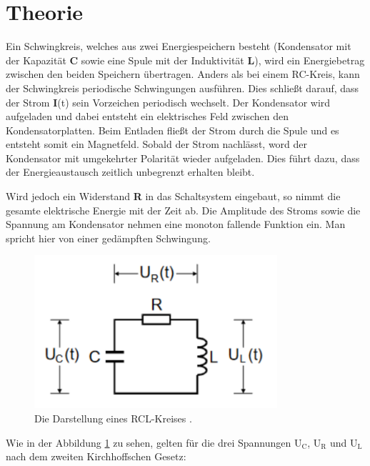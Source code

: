 \section{Theorie}

\begin{flushleft}
    Ein Schwingkreis, welches aus zwei Energiespeichern besteht (Kondensator mit der Kapazität \textbf{C} sowie eine Spule mit der Induktivität \textbf{L}), wird ein Energiebetrag zwischen den beiden Speichern übertragen.
    Anders als bei einem RC-Kreis, kann der Schwingkreis periodische Schwingungen ausführen.
    Dies schließt darauf, dass der Strom \textbf{I}(t) sein Vorzeichen periodisch wechselt.
    Der Kondensator wird aufgeladen und dabei entsteht ein elektrisches Feld zwischen den Kondensatorplatten.
    Beim Entladen fließt der Strom durch die Spule und es entsteht somit ein Magnetfeld.
    Sobald der Strom nachlässt, word der Kondensator mit umgekehrter Polarität wieder aufgeladen.  
    Dies führt dazu, dass der Energieaustausch zeitlich unbegrenzt erhalten bleibt.
\end{flushleft}

\begin{flushleft}
    Wird jedoch ein Widerstand \textbf{R} in das Schaltsystem eingebaut, so nimmt die gesamte elektrische
    Energie mit der Zeit ab. Die Amplitude des Stroms sowie die Spannung am Kondensator nehmen eine
    monoton fallende Funktion ein. Man spricht hier von einer gedämpften Schwingung.
\end{flushleft}

 
\begin{figure}[H]
    \centering
    \includegraphics[width=90mm]{bilder/Ab1.png}
    \caption{Die Darstellung eines RCL-Kreises \cite[1]{GedUErzSch}. \label{Abbildung1}}
\end{figure}


\begin{flushleft}
    Wie in der Abbildung \ref{Abbildung1} zu sehen, gelten für die drei Spannungen $\text{U}_{\text{C}}$, $\text{U}_{\text{R}}$ und $\text{U}_{\text{L}}$ nach dem zweiten Kirchhoffschen Gesetz:
\end{flushleft}


